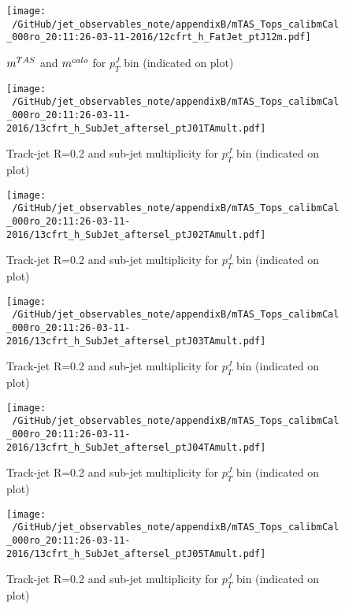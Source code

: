 \begin{figure}
 
\texttt{[image: ~/GitHub/jet\_observables\_note/appendixB/mTAS\_Tops\_calibmCal\_000ro\_20:11:26-03-11-2016/12cfrt\_h\_FatJet\_ptJ12m.pdf]}
\caption{$m^{TAS}$ and $m^{calo}$ for $p_{T}^{J}$ bin (indicated on plot) }
 
\end{figure}
\clearpage %
\begin{figure}
 
\texttt{[image: ~/GitHub/jet\_observables\_note/appendixB/mTAS\_Tops\_calibmCal\_000ro\_20:11:26-03-11-2016/13cfrt\_h\_SubJet\_aftersel\_ptJ01TAmult.pdf]}
\caption{Track-jet R=0.2 and sub-jet multiplicity for $p_{T}^{J}$ bin (indicated on plot) }
 
\end{figure}
 
\begin{figure}
 
\texttt{[image: ~/GitHub/jet\_observables\_note/appendixB/mTAS\_Tops\_calibmCal\_000ro\_20:11:26-03-11-2016/13cfrt\_h\_SubJet\_aftersel\_ptJ02TAmult.pdf]}
\caption{Track-jet R=0.2 and sub-jet multiplicity for $p_{T}^{J}$ bin (indicated on plot) }
 
\end{figure}
 
\begin{figure}
 
\texttt{[image: ~/GitHub/jet\_observables\_note/appendixB/mTAS\_Tops\_calibmCal\_000ro\_20:11:26-03-11-2016/13cfrt\_h\_SubJet\_aftersel\_ptJ03TAmult.pdf]}
\caption{Track-jet R=0.2 and sub-jet multiplicity for $p_{T}^{J}$ bin (indicated on plot) }
 
\end{figure}
 
\begin{figure}
 
\texttt{[image: ~/GitHub/jet\_observables\_note/appendixB/mTAS\_Tops\_calibmCal\_000ro\_20:11:26-03-11-2016/13cfrt\_h\_SubJet\_aftersel\_ptJ04TAmult.pdf]}
\caption{Track-jet R=0.2 and sub-jet multiplicity for $p_{T}^{J}$ bin (indicated on plot) }
 
\end{figure}
 
\begin{figure}
 
\texttt{[image: ~/GitHub/jet\_observables\_note/appendixB/mTAS\_Tops\_calibmCal\_000ro\_20:11:26-03-11-2016/13cfrt\_h\_SubJet\_aftersel\_ptJ05TAmult.pdf]}
\caption{Track-jet R=0.2 and sub-jet multiplicity for $p_{T}^{J}$ bin (indicated on plot) }
 
\end{figure}
 
